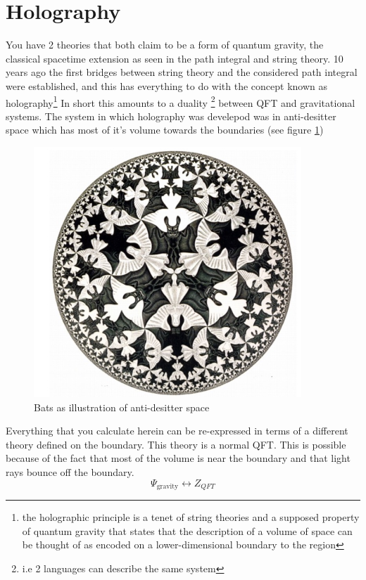 \documentclass{article}
\begin{document}
  \section{Holography}
  You have 2 theories that both claim to be a form of quantum gravity, the classical spacetime extension as seen in the path integral and string theory. 10 years ago the first bridges between string theory and the considered path integral were established, and this has everything to do with the concept known as holography\footnote{the holographic principle is a tenet of string theories and a supposed property of quantum gravity that states that the description of a volume of space can be thought of as encoded on a lower-dimensional boundary to the region}
  In short this amounts to a duality \footnote{i.e 2 languages can describe the same system}  between QFT and gravitational systems. The system in which holography was develepod was in anti-desitter space which has most of it's volume towards the boundaries (see figure \ref{fig:vleermuizen})
  \begin{figure}
    \centering
    \includegraphics[scale=0.5]{vleermuizen.png}
    \caption{Bats as illustration of anti-desitter space}
    \label{fig:vleermuizen}
  \end{figure}
  Everything that you calculate herein can be re-expressed in terms of a different theory defined on the boundary. This theory is a normal QFT. This is possible because of the fact that most of the volume is near the boundary and that light rays bounce off the boundary. 
  \begin{equation}
    \Psi_{\text{gravity}} \leftrightarrow Z_{QFT}
  \end{equation}
\end{document}
